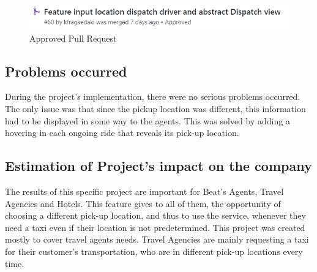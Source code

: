 \begin{figure}[H]
	\begin{center}
		\includegraphics[scale=0.85]{images/my_projects/input/input-location-PR.png}
	\end{center}
	\caption{Approved Pull Request}
\end{figure}

\subsection{Problems occurred} 

During the project's implementation, there were no serious problems occurred. The only issue was that since the pickup location was different, this information had to be displayed in some way to the agents. This was solved by adding a hovering in each ongoing ride that reveals its pick-up location. \par

\subsection{Estimation of Project's impact on the company}

The results of this specific project are important for Beat's Agents, Travel Agencies and Hotels. This feature gives to all of them, the opportunity of choosing a different pick-up location, and thus to use the service, whenever they need a taxi even if their location is not predetermined. This project was created mostly to cover travel agents needs. Travel Agencies are mainly requesting a taxi for their customer's transportation, who are in different pick-up locations every time. \par
